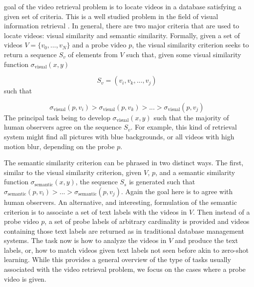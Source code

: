 	
 goal of the video retrieval problem is to locate videos in a database satisfying a given set of criteria. This is a well studied problem in the field of visual information retrieval \cite{dong2017video, aslandogan1999techniques, hanjalic1999automated, jiang2007towards, liu2017deep, naphade1998probabilistic, snoek2008concept, zhang1997integrated}. In general, there are two major criteria that are used to locate videos: visual similarity and semantic similarity. Formally, given a set of videos $V = \{v_0, ..., v_N\}$ and a probe video $p$, the visual similarity criterion seeks to return a sequence $S_v$ of elements from $V$ such that, given some visual similarity function $\sigma_{\text{visual}}(x, y)$

\begin{equation*}
    S_v = (v_i, v_k, ..., v_j)
\end{equation*}
such that 

\begin{equation*}
\sigma_{\text{visual}}(p, v_i) > \sigma_{\text{visual}}(p, v_k) > ... > \sigma_{\text{visual}}(p, v_j)
\end{equation*}
The principal task being to develop $\sigma_{\text{visual}}(x, y)$ such that the majority of human observers agree on the sequence $S_v$. For example, this kind of retrieval system might find all pictures with blue backgrounds, or all videos with high motion blur, depending on the probe $p$. 

The semantic similarity criterion can be phrased in two distinct ways. The first, similar to the visual similarity criterion, given $V$, $p$, and a semantic similarity function $\sigma_{\text{semantic}}(x, y)$, the sequence $S_s$ is generated such that $\sigma_{\text{semantic}}(p, v_i) > ... > \sigma_{\text{semantic}}(p, v_j)$. Again the goal here is to agree with human observers. An alternative, and interesting, formulation of the semantic criterion is to associate a set of text labels with the videos in $V$. Then instead of a probe video $p$, a set of probe labels of arbitrary cardinality is provided and videos containing those text labels are returned as in traditional database management systems. The task now is how to analyze the videos in $V$ and produce the text labels, or, how to match videos given text labels not seen before akin to zero-shot learning. While this provides a general overview of the type of tasks usually associated with the video retrieval problem, we focus on the cases where a probe video is given.

